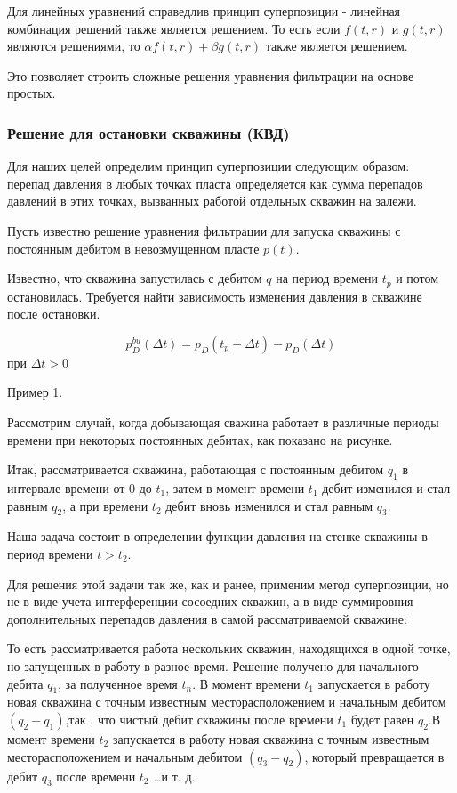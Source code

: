 Для линейных уравнений справедлив принцип суперпозиции - линейная комбинация решений также является решением. То есть если $f(t,r)$ и $g(t,r)$ являются решениями, то $\alpha f(t,r) + \beta g(t,r)$  также является решением.

Это позволяет строить сложные решения уравнения фильтрации на основе простых.

\subsubsection{Решение для остановки скважины (КВД)}

Для наших целей определим принцип суперпозиции следующим образом: перепад давления в любых точках пласта определяется как сумма перепадов давлений в этих точках, вызванных работой отдельных скважин на залежи. 

Пусть известно решение уравнения фильтрации для запуска скважины с постоянным дебитом в невозмущенном пласте   $p(t)$. 

Известно, что скважина запустилась с дебитом $q$ на период времени $t_p$ и потом остановилась. Требуется найти зависимость изменения давления в скважине после остановки.

$$ p_{D}^{bu}(\Delta t)=p_D(t_p +\Delta t) - p_D(\Delta t)$$  при $\Delta t > 0$

Пример 1.

Рассмотрим случай, когда добывающая сважина работает в различные периоды времени при некоторых постоянных дебитах, как показано на рисунке.  



Итак, рассматривается скважина, работающая с постоянным дебитом $q_1$ в интервале времени от 0 до $t_1$, затем в момент времени $t_1$ дебит изменился и стал равным $q_2$, а при времени $t_2$ дебит вновь изменился и стал равным $q_3$.

Наша задача состоит в определении функции давления на стенке скважины в период времени $t>t_2$.

Для решения этой задачи так же, как и ранее, применим метод суперпозиции, но не в виде учета интерференции сосоедних скважин, а в виде суммировния дополнительных перепадов давления в самой рассматриваемой скважине:

То есть рассматривается работа нескольких скважин, находящихся в одной точке, но запущенных в работу в разное время. Решение получено для начального дебита $q_1$, за полученное время $t_n$. В момент времени $t_1$ запускается в работу новая скважина с точным известным месторасположением и начальным дебитом $ \left(q_2 - q_1\right)$,так , что чистый дебит скважины после времени  $t_1$ будет равен  $q_2$.В момент времени $t_2$ запускается в работу новая скважина с точным известным месторасположением и начальным дебитом $ \left(q_3 - q_2\right)$, который превращается в дебит $q_3$ после времени $t_2$ …и т. д.

